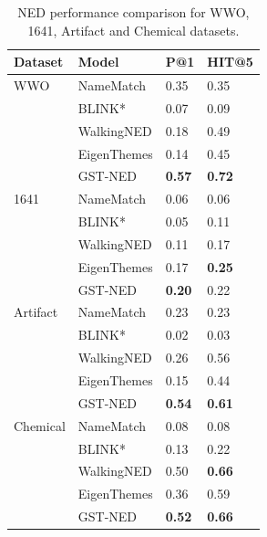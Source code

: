 \documentclass[11pt]{article}
\begin{document}
\begin{table}[htbp]
\centering
\begin{tabular}{p{2cm}p{2cm}p{1cm}p{1cm}}
Dataset & Model & P@1 & HIT@5\\[0pt]
\hline
 WWO
 & NameMatch	& 0.35 & 0.35 \\
 & BLINK* & 0.07 & 0.09 \\
 & WalkingNED & 0.18 & 0.49\\
 & EigenThemes & 0.14 & 0.45\\
 & GST-NED & \textbf{0.57} & \textbf{0.72}\\
\hline
 1641
 & NameMatch & 0.06 & 0.06 \\
 & BLINK* & 0.05	& 0.11 \\
 & WalkingNED & 0.11 & 0.17\\
 & EigenThemes & 0.17 & \textbf{0.25}\\
 & GST-NED & \textbf{0.20} & 0.22 \\
\hline
Artifact
 & NameMatch & 0.23 & 0.23 \\
 & BLINK* & 0.02	& 0.03 \\
 & WalkingNED & 0.26 & 0.56\\
 & EigenThemes & 0.15 & 0.44\\
 & GST-NED & \textbf{0.54} & \textbf{0.61} \\
\hline
 Chemical  
 & NameMatch	& 0.08 & 0.08 \\
 & BLINK* & 0.13 & 0.22 \\
 & WalkingNED & 0.50 & \textbf{0.66}\\
 & EigenThemes & 0.36 & 0.59\\
 & GST-NED & \textbf{0.52} & \textbf{0.66}\\
 \hline
\end{tabular}
\caption{\label{tab:org1c6e60d} NED performance comparison for WWO, 1641, Artifact and Chemical datasets.}
\end{table}
\end{document}
